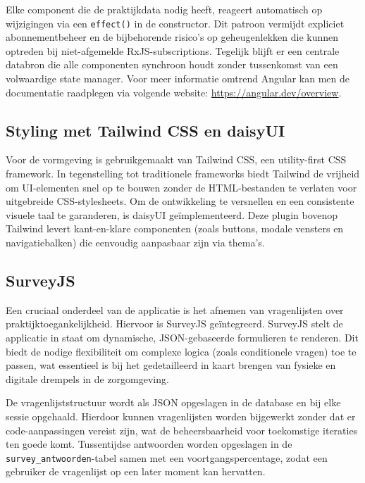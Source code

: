 Elke component die de praktijkdata nodig heeft, reageert automatisch op wijzigingen via een \texttt{effect()} in de constructor.
Dit patroon vermijdt expliciet abonnementbeheer en de bijbehorende risico's op geheugenlekken die kunnen optreden bij niet-afgemelde RxJS-subscriptions.
Tegelijk blijft er een centrale databron die alle componenten synchroon houdt zonder tussenkomst van een volwaardige state manager.
Voor meer informatie omtrend Angular kan men de documentatie raadplegen via volgende website: \href{https://angular.dev/overview}{https://angular.dev/overview}.

\subsection{Styling met Tailwind CSS en daisyUI}
\label{subsec:styling}

Voor de vormgeving is gebruikgemaakt van Tailwind CSS, een utility-first CSS framework. 
In tegenstelling tot traditionele frameworks biedt Tailwind de vrijheid om UI-elementen snel op te bouwen zonder de HTML-bestanden te verlaten voor uitgebreide CSS-stylesheets. 
Om de ontwikkeling te versnellen en een consistente visuele taal te garanderen, is daisyUI geïmplementeerd. 
Deze plugin bovenop Tailwind levert kant-en-klare componenten (zoals buttons, modale vensters en navigatiebalken) die eenvoudig aanpasbaar zijn via thema's.

\subsection{SurveyJS}
\label{subsec:surveyjs}

Een cruciaal onderdeel van de applicatie is het afnemen van vragenlijsten over praktijktoegankelijkheid. 
Hiervoor is SurveyJS geïntegreerd. SurveyJS stelt de applicatie in staat om dynamische, JSON-gebaseerde formulieren te renderen. 
Dit biedt de nodige flexibiliteit om complexe logica (zoals conditionele vragen) toe te passen, wat essentieel is bij het gedetailleerd in kaart brengen van fysieke en digitale drempels in de zorgomgeving.
\medskip

De vragenlijststructuur wordt als JSON opgeslagen in de database en bij elke sessie opgehaald.
Hierdoor kunnen vragenlijsten worden bijgewerkt zonder dat er code-aanpassingen vereist zijn, wat de beheersbaarheid voor toekomstige iteraties ten goede komt.
Tussentijdse antwoorden worden opgeslagen in de \texttt{survey\_antwoorden}-tabel samen met een voortgangspercentage, zodat een gebruiker de vragenlijst op een later moment kan hervatten.

